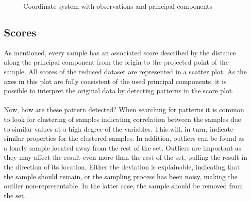 \begin{figure}[H]
\begin{minipage}{\wd\FigBox}
    \centering\usebox{\FigBox}
  \end{minipage}
  \begin{minipage}{\wd\FigBox}
    \centering\usebox{\FigBox}
  \end{minipage}\hspace*{\FigHSkip}
  \caption{Coordinate system with observations and principal components}
  \label{fig:pca1}
\end{figure}


\subsection{Scores}
As mentioned, every sample has an associated score described by the distance along the principal component from the origin to the projected point of the sample. All scores of the reduced dataset are represented in a scatter plot. As the axes in this plot are fully consistent of the used principal components, it is possible to interpret the original data by detecting patterns in the score plot. 
\\\\
Now, how are these pattern detected? When searching for patterns it is common to look for clustering of samples indicating correlation between the samples due to similar values at a high degree of the variables. This will, in turn, indicate similar properties for the clustered samples. In addition, outliers can be found as a lonely sample located away from the rest of the set. Outliers are important as they may affect the result even more than the rest of the set, pulling the result in the direction of its location. Either the deviation is explainable, indicating that the sample should remain, or the sampling process has been noisy, making the outlier non-representable. In the latter case, the sample should be removed from the set. 

